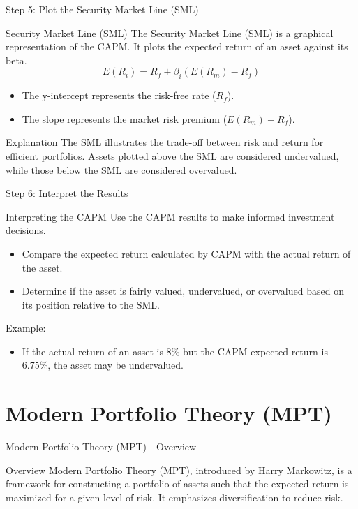 \documentclass{beamer}
\begin{document}
\begin{frame}{Step 5: Plot the Security Market Line (SML)}
  \begin{block}{Security Market Line (SML)}
    The Security Market Line (SML) is a graphical representation of the CAPM. It plots the expected return of an asset against its beta.
    \begin{equation*}
      E(R_i) = R_f + \beta_i (E(R_m) - R_f)
    \end{equation*}
    \begin{itemize}
      \item The y-intercept represents the risk-free rate (\(R_f\)).
      \item The slope represents the market risk premium (\(E(R_m) - R_f\)).
    \end{itemize}
  \end{block}
  \begin{block}{Explanation}
    The SML illustrates the trade-off between risk and return for efficient portfolios. Assets plotted above the SML are considered undervalued, while those below the SML are considered overvalued.
  \end{block}
\end{frame}

\begin{frame}{Step 6: Interpret the Results}
  \begin{block}{Interpreting the CAPM}
    Use the CAPM results to make informed investment decisions.
    \begin{itemize}
      \item Compare the expected return calculated by CAPM with the actual return of the asset.
      \item Determine if the asset is fairly valued, undervalued, or overvalued based on its position relative to the SML.
    \end{itemize}
    Example:
    \begin{itemize}
      \item If the actual return of an asset is 8\% but the CAPM expected return is 6.75\%, the asset may be undervalued.
    \end{itemize}
  \end{block}
\end{frame}

\section{Modern Portfolio Theory (MPT)}
\begin{frame}{Modern Portfolio Theory (MPT) - Overview}
  \begin{block}{Overview}
    Modern Portfolio Theory (MPT), introduced by Harry Markowitz, is a framework for constructing a portfolio of assets such that the expected return is maximized for a given level of risk. It emphasizes diversification to reduce risk.
  \end{block}
\end{frame}
\end{document}
